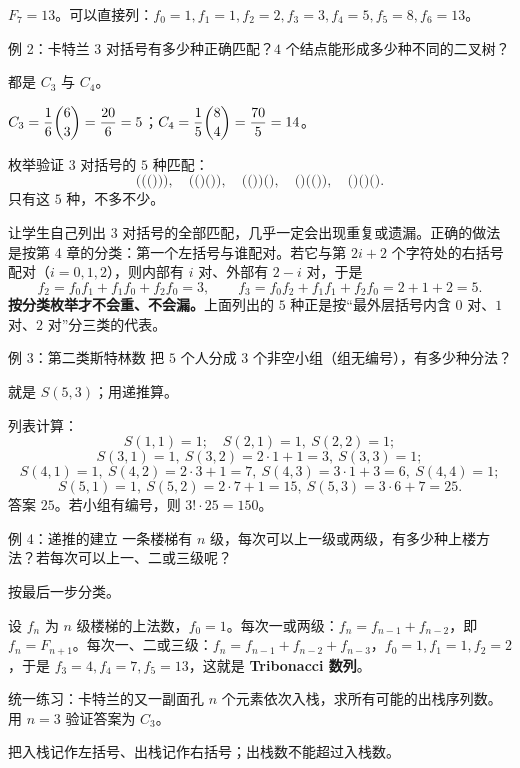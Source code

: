 \sol $F_7=13$。可以直接列：$f_0=1,f_1=1,f_2=2,f_3=3,f_4=5,f_5=8,f_6=13$。

\begin{problem}{例 2：卡特兰}
$3$ 对括号有多少种正确匹配？$4$ 个结点能形成多少种不同的二叉树？
\end{problem}
\hint 都是 $C_3$ 与 $C_4$。

\sol $C_3=\dfrac16\dbinom63=\dfrac{20}{6}=5$；$C_4=\dfrac15\dbinom84=\dfrac{70}{5}=14$。

枚举验证 $3$ 对括号的 $5$ 种匹配：
\[
\texttt{((()))},\quad \texttt{(()())},\quad \texttt{(())()},\quad \texttt{()(())},\quad \texttt{()()()}.
\]
只有这 $5$ 种，不多不少。

\begin{teach}
让学生自己列出 $3$ 对括号的全部匹配，几乎一定会出现重复或遗漏。正确的做法是按第 4 章的分类：第一个左括号与谁配对。若它与第 $2i+2$ 个字符处的右括号配对（$i=0,1,2$），则内部有 $i$ 对、外部有 $2-i$ 对，于是
\[
f_2=f_0f_1+f_1f_0+f_2f_0=3,\qquad
f_3=f_0f_2+f_1f_1+f_2f_0=2+1+2=5.
\]
\textbf{按分类枚举才不会重、不会漏。}上面列出的 $5$ 种正是按“最外层括号内含 $0$ 对、$1$ 对、$2$ 对”分三类的代表。
\end{teach}

\begin{problem}{例 3：第二类斯特林数}
把 $5$ 个人分成 $3$ 个非空小组（组无编号），有多少种分法？
\end{problem}
\hint 就是 $S(5,3)$；用递推算。

\sol 列表计算：
\[
S(1,1)=1;\quad S(2,1)=1,\ S(2,2)=1;
\]
\[
S(3,1)=1,\ S(3,2)=2\cdot1+1=3,\ S(3,3)=1;
\]
\[
S(4,1)=1,\ S(4,2)=2\cdot3+1=7,\ S(4,3)=3\cdot1+3=6,\ S(4,4)=1;
\]
\[
S(5,1)=1,\ S(5,2)=2\cdot7+1=15,\ S(5,3)=3\cdot6+7=25.
\]
答案 $25$。若小组有编号，则 $3!\cdot25=150$。

\begin{problem}{例 4：递推的建立}
一条楼梯有 $n$ 级，每次可以上一级或两级，有多少种上楼方法？若每次可以上一、二或三级呢？
\end{problem}
\hint 按最后一步分类。

\sol 设 $f_n$ 为 $n$ 级楼梯的上法数，$f_0=1$。每次一或两级：$f_n=f_{n-1}+f_{n-2}$，即 $f_n=F_{n+1}$。每次一、二或三级：$f_n=f_{n-1}+f_{n-2}+f_{n-3}$，$f_0=1,f_1=1,f_2=2$，于是 $f_3=4,f_4=7,f_5=13$，这就是\textbf{ Tribonacci 数列}。

\begin{problem}{统一练习：卡特兰的又一副面孔}
$n$ 个元素依次入栈，求所有可能的出栈序列数。用 $n=3$ 验证答案为 $C_3$。
\end{problem}
\hint 把入栈记作左括号、出栈记作右括号；出栈数不能超过入栈数。

